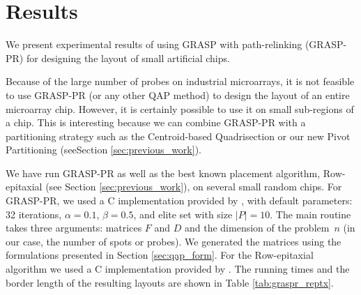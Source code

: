\documentclass[english]{lni}
\begin{document}
\section{Results}
\label{sec:results}

We present experimental results of using GRASP with path-relinking (GRASP-PR)
for designing the layout of small artificial chips.

Because of the large number of probes on industrial microarrays, it is not
feasible to use GRASP-PR (or any other QAP method) to design the layout of an
entire microarray chip. However, it is certainly possible to use it on small
sub-regions of a chip. This is interesting because we can combine GRASP-PR
with a partitioning strategy such as the Centroid-based Quadrisection or our
new Pivot Partitioning (seeSection \ref{sec:previous_work}).

We have run GRASP-PR as well as the best known placement algorithm,
Row-epitaxial (see Section \ref{sec:previous_work}), on several small random
chips. For GRASP-PR, we used a C implementation provided by
\cite{OLIVEIRA04}, with default parameters: 32 iterations, $\alpha=0.1$,
$\beta=0.5$, and elite set with size $|P|=10$. The main routine takes
three arguments: matrices $F$ and $D$ and the dimension of the problem~$n$ (in
our case, the number of spots or probes). We generated the matrices using the
formulations presented in Section \ref{sec:qap_form}. For the Row-epitaxial
algorithm we used a C implementation provided by \cite{KAHNG03A}. The
running times and the border length of the resulting layouts are shown in
Table \ref{tab:graspr_reptx}.
\end{document}
